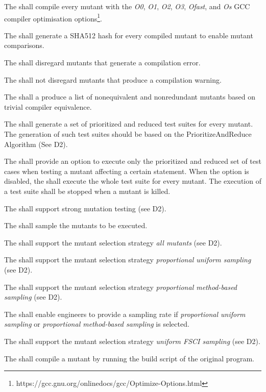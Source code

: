\RQ{} The \FAQAS shall compile every mutant with the \textit{O0}, \textit{O1}, \textit{O2}, \textit{O3}, \textit{Ofast}, and \textit{Os} GCC compiler optimisation options\footnote{https://gcc.gnu.org/onlinedocs/gcc/Optimize-Options.html}.

\RQ{} The \FAQAS shall generate a SHA512 hash for every compiled mutant to enable mutant comparisons.

\RQ{} The \FAQAS shall disregard mutants that generate a compilation error.

\RQ{} The \FAQAS shall not disregard mutants that produce a compilation warning.

\RQ{} The \FAQAS shall a produce a list of nonequivalent and nonredundant mutants based on trivial compiler equivalence.

\RQ{} The \FAQAS shall generate a set of prioritized and reduced test suites for every mutant.
The generation of such test suites should be  based on the PrioritizeAndReduce Algorithm (See D2).

\RQ{} The \FAQAS shall provide an option to execute only the prioritized and reduced set of test cases when testing a mutant affecting a certain statement. When the option is disabled, the \FAQAS shall execute the whole test suite for every mutant. The execution of a test suite shall be stopped when a mutant is killed.

\RQ{} The \FAQAS shall support strong mutation testing (see D2).

\RQ{} The \FAQAS shall sample the mutants to be executed.

\RQ{} The \FAQAS shall support the mutant selection strategy \textit{all mutants} (see D2).

\RQ{} The \FAQAS shall support the mutant selection strategy \textit{proportional uniform sampling} (see D2).

\RQ{} The \FAQAS shall support the mutant selection strategy \textit{proportional method-based sampling} (see D2).

\RQ{} The \FAQAS shall enable engineers to provide a sampling rate if \textit{proportional uniform sampling} or \textit{proportional method-based sampling} is selected.

\RQ{} The \FAQAS shall support the mutant selection strategy \textit{uniform FSCI sampling} (see D2).

\RQ{} The \FAQAS shall compile a mutant by running the build script of the original program.

